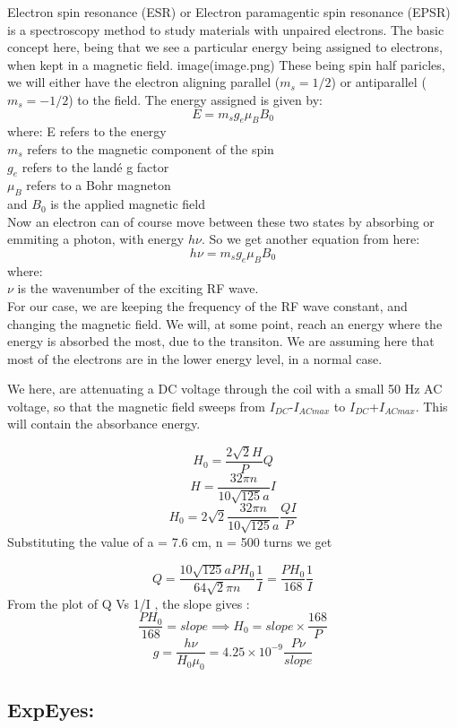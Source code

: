 \documentclass{double}
\begin{document}
Electron spin resonance (ESR) or Electron paramagentic spin resonance (EPSR) is a spectroscopy method to study materials with unpaired electrons. The basic concept here, being that we see a particular energy being assigned to electrons, when kept in a magnetic field.
image(image.png)
These being spin half paricles, we will either have the electron aligning parallel (\(m_s = 1/2\)) or antiparallel (\(m_s = -1/2\)) to the field. The energy assigned is given by:
\[ E = m_s g_e \mu_B B_0 \]
where:
E refers to the energy\\
\(m_s\) refers to the magnetic component of the spin\\
\(g_e\) refers to the landé g factor\\
\(\mu_B\) refers to a Bohr magneton\\
and \(B_0\) is the applied magnetic field\\
Now an electron can of course move between these two states by absorbing or emmiting a photon, with energy \(h\nu\). So we get another equation from here:\\
\[ h\nu=m_s g_e \mu_B B_0 \]
where:\\
\(\nu\) is the wavenumber of the exciting RF wave.\\
For our case, we are keeping the frequency of the RF wave constant, and changing the magnetic field. We will, at some point, reach an energy where the energy is absorbed the most, due to the transiton. We are assuming here that most of the electrons are in the lower energy level, in a normal case.

We here, are attenuating a DC voltage through the coil with a small 50 Hz AC voltage, so that the magnetic field sweeps from \(I_{DC}\)-\(I_{AC max}\) to \(I_{DC}\)+\(I_{AC max}\). This will contain the absorbance energy.

\[ H_0 = \frac{2\sqrt{2}H}{P}Q \]
\[ H=\frac{32\pi n}{10\sqrt{125}a}I \]
\[ H_0=2\sqrt{2}\frac{32\pi n}{10\sqrt{125}a}\frac{QI}{P} \]
Substituting the value of a = 7.6 cm, n = 500 turns we get

\begin{equation} Q=\frac{10\sqrt{125}a PH_0}{64\sqrt{2}\pi n }\frac{1}{I}=\frac{PH_0}{168}\frac{1}{I} \label{eq:desc}\end{equation}
From the plot of Q Vs 1/I , the slope gives :
\[ \frac{PH_0}{168}=slope \implies H_0=slope \times \frac{168}{P} \]
\[ g=\frac{h \nu}{H_0 \mu_0} = 4.25\times10^{-9} \frac{P \nu}{slope} \]

\subsection{ExpEyes:}
\end{document}
